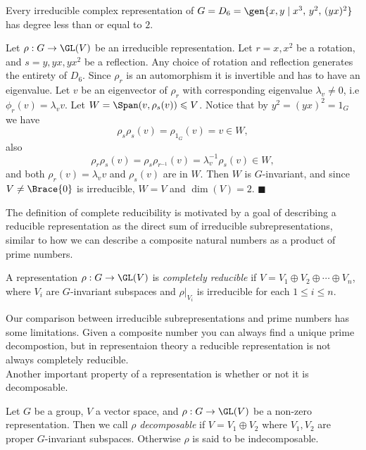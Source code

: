 \documentclass[../Project.tex]{subfiles}
\begin{document}
\begin{prop}[{\cite[page 11]{3}}]
	Every irreducible complex representation of $G = D_6 = \gen{x,y\;\vert\;x^3,\, y^2,\,(yx)^2}$ has degree less than or equal to $2$.
\end{prop}
\begin{proo*}[{\cite[page 11]{3}}]
	Let $\rho : G \to \GL(V)$ be an irreducible representation. Let $r = x,x^2$ be a rotation, and $s = y, yx, yx^2$ be a reflection. Any choice of rotation and reflection generates the entirety of $D_6$. Since $\rho_r$ is an automorphism it is invertible and has to have an eigenvalue. Let $v$ be an eigenvector of $\rho_r$ with corresponding eigenvalue $\lambda_v \neq 0$, i.e $\phi_r(v) = \lambda_vv$. Let $W = \Span(v,\rho_{s}(v)) \leqslant V$. Notice that by $y^2 = (yx)^2 = 1_G$ we have
	$$\rho_s\rho_s(v) = \rho_{1_G}(v) = v \in W,$$
	also
	$$\rho_r\rho_s(v) = \rho_s\rho_{r^{-1}}(v) = \lambda^{-1}_v\rho_{s}(v) \in W,$$
	and both $\rho_r(v) = \lambda_vv$ and $\rho_s(v)$ are in $W$. Then $W$ is $G$-invariant, and since $V \neq \Brace{0}$ is irreducible, $W = V$ and $\dim(V) = 2$.
	\hfill $\blacksquare$\\
\end{proo*}

The definition of complete reducibility is motivated by a goal of describing a reducible representation as the direct sum of irreducible subrepresentations, similar to how we can describe a composite natural numbers as a product of prime numbers.

\begin{defi}
	A representation $\rho : G \to \GL(V)$ is \textit{completely reducible} if $V = V_1 \oplus V_2 \oplus \cdots \oplus V_n$, where $V_i$ are $G$-invariant subspaces and $\rho\vert_{V_i}$ is irreducible for each $1 \leqslant i \leqslant n$.\\
\end{defi}
Our comparison between irreducible subrepresentations and prime numbers has some limitations. Given a composite number you can always find a unique prime decompostion, but in representaion theory a reducible representation is not always completely reducible.\\

Another important property of a representation is whether or not it is decomposable.

\begin{defi}
	Let $G$ be a group, $V$ a vector space, and $\rho : G \to \GL(V)$ be a non-zero representation. Then we call $\rho$ \textit{decomposable} if $V = V_1 \oplus V_2$ where $V_1,V_2$ are proper $G$-invariant subspaces. Otherwise $\rho$ is said to be indecomposable.\\
\end{defi}
\end{document}
